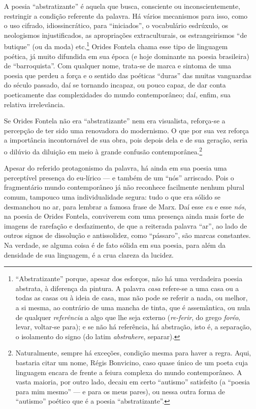 A poesia ``abstratizante'' é aquela que busca, consciente ou inconscientemente, restringir a condição referente da palavra. Há vários mecanismos para isso, como o uso cifrado, idiossincrático, para
``iniciados'', o vocabulário esdrúxulo, os neologismos injustiﬁcados, as
apropriações extraculturais, os estrangeirismos ``de butique'' (ou da
moda) etc.\footnote{``Abstratizante'' porque, apesar dos esforços, não há uma verdadeira
poesia abstrata, à diferença da pintura. A palavra \emph{casa} refere-se
a uma casa ou a todas as casas ou à ideia de casa, mas não pode se
referir a nada, ou melhor, a si mesma, ao contrário de uma mancha de
tinta, que é assemântica, ou nula de qualquer \emph{referência} a algo
que lhe seja externo (\emph{re-ferir}, do grego \emph{foréo}, levar, voltar-se para); e se não
há referência, há abstração, isto é, a separação, o isolamento do signo
(do latim \emph{abstrahere}, separar).} Orides Fontela chama esse tipo de linguagem poética, já
muito difundida em sua época (e hoje dominante na poesia brasileira) de
``barroquista''. Com qualquer nome, trata-se de marca e sintoma de uma
poesia que perdeu a força e o sentido das poéticas ``duras'' das muitas
vanguardas do século passado, daí se tornando incapaz, ou pouco capaz,
de dar conta poeticamente das complexidades do mundo contemporâneo; daí,
enﬁm, sua relativa irrelevância.

Se Orides Fontela não era ``abstratizante'' nem era visualista, reforça-se a percepção de ter sido uma renovadora do modernismo. O que por sua
vez reforça a importância incontornável de sua obra, pois depois dela e
de sua geração, seria o dilúvio da diluição em meio à grande confusão
contemporânea.\footnote{Naturalmente, sempre há exceções, condição mesma para haver a regra.
Aqui, bastaria citar um nome, Régis Bonvicino, caso quase único de um
poeta cuja linguagem encara de frente a feiura complexa do mundo
contemporâneo. A vasta maioria, por outro lado, decaiu em certo
``autismo'' satisfeito (a ``poesia para mim mesmo'' --- e para os meus
pares), ou nessa outra forma de ``autismo'' poético que é a poesia
``abstratizante''.}

Apesar do referido protagonismo da palavra, há ainda em sua poesia uma
perceptível presença do eu-lírico --- e também de um ``nós'' arriscado.
Pois o fragmentário mundo contemporâneo já não reconhece facilmente
nenhum plural comum, tampouco uma individualidade segura: tudo o que era
sólido se desmanchou no ar, para lembrar a famosa frase de Marx. Daí
esse \emph{eu} e esse \emph{nós}, na poesia de Orides Fontela,
conviverem com uma presença ainda mais forte de imagens de rarefação e
desfazimento, de que a reiterada palavra ``ar'', ao lado de outros
signos de dissolução e antissolidez, como ``pássaro'', são marcas
constantes. Na verdade, se alguma coisa é de fato sólida em sua poesia,
para além da densidade de sua linguagem, é a crua clareza da lucidez.


